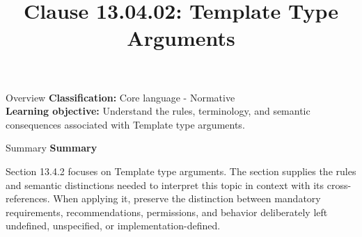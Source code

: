 \documentclass[10pt,letterpaper]{article}
\title{Clause 13.04.02: Template Type Arguments}
\author{}
\date{}
\begin{document}
\maketitle
\begin{CornellOverviewBox}{Overview}
\textbf{Classification:} Core language - Normative\\[2pt]
\textbf{Learning objective:} Understand the rules, terminology, and semantic consequences associated with Template type arguments.
\end{CornellOverviewBox}\begin{CornellSummaryBox}{Summary}
{\sffamily\bfseries\color{Accent} Summary}\par\vspace{3pt}Section 13.4.2 focuses on Template type arguments. The section supplies the rules and semantic distinctions needed to interpret this topic in context with its cross-references. When applying it, preserve the distinction between mandatory requirements, recommendations, permissions, and behavior deliberately left undefined, unspecified, or implementation-defined.
\end{CornellSummaryBox}
\end{document}
